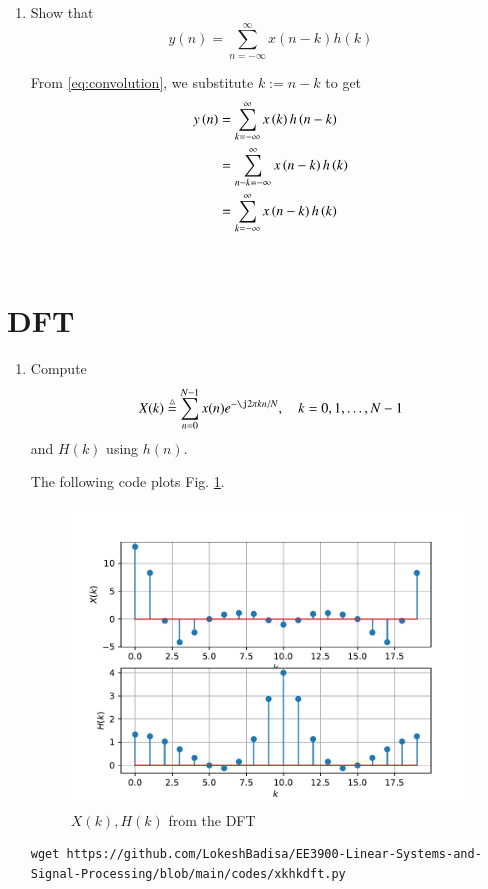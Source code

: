 \documentclass[journal,12pt,twocolumn]{IEEEtran}
\renewcommand\thesection{\arabic{section}}
\begin{document}
\begin{enumerate}[label=\thesection.\arabic*]
\item Show that
\begin{equation}
y(n) =  \sum_{n=-\infty}^{\infty}x(n-k)h(k)
\end{equation}

\solution 
From \eqref{eq:convolution}, we substitute $k := n - k$ to get
\begin{align}
y\left(n\right) &= \sum_{k=-\infty}^{\infty}x\left(k\right)h\left(n - k\right) \\
		  &= \sum_{n - k=-\infty}^{\infty}x\left(n - k\right)h\left(k\right) \\
		  &= \sum_{k=-\infty}^{\infty}x\left(n - k\right)h\left(k\right)
\end{align}
\ \\
\end{enumerate}

\section{DFT}
\begin{enumerate}[label=\thesection.\arabic*]

\item
Compute
\begin{equation}
X(k) \define \sum _{n=0}^{N-1}x(n) e^{-\j2\pi kn/N}, \quad k = 0,1,\dots, N-1
\end{equation}
and $H(k)$ using $h(n)$.

\solution The following code plots Fig. \ref{fig:xkhk}. 
\begin{figure}[!ht]
\centering
\includegraphics[width=\columnwidth]{./figs/xkhk}
\caption{$X(k) ,H(k)$ from the DFT}
\label{fig:xkhk}
\end{figure}
\begin{lstlisting}
wget https://github.com/LokeshBadisa/EE3900-Linear-Systems-and-Signal-Processing/blob/main/codes/xkhkdft.py


\end{lstlisting}
\end{enumerate}
\end{document}
